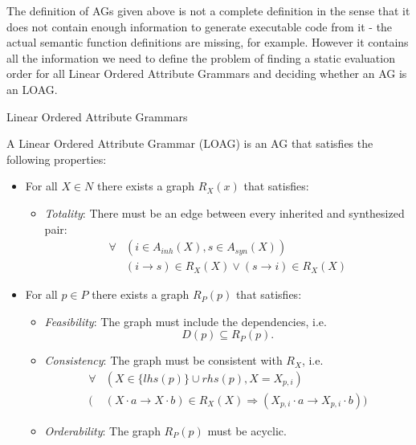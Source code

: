 The definition of AGs given above is not a complete definition in the sense that
it does not contain enough information to generate executable code from it -
the actual semantic function definitions are missing, for example.
However it contains all the information we need to define the problem of 
finding a static evaluation order for all Linear Ordered Attribute Grammars and
deciding whether an AG is an LOAG.

\begin{definition}{Linear Ordered Attribute Grammars}

A Linear Ordered Attribute Grammar (LOAG) is an AG that satisfies
the following properties:
\begin{itemize}
 \item For all $X \in N$ there exists a graph $R_X(x)$ that satisfies:
    \begin{itemize}
        \item \emph{Totality}: There must be an edge between every inherited
                and synthesized pair:
                \begin{equation*}
                 \begin{aligned}
                    \forall &(i \in A_{inh}(X), s\in A_{syn}(X))\\
                        &(i\rightarrow s) \in R_X(X) \lor (s\rightarrow i)
                    \in R_X(X)
                 \end{aligned}
                \end{equation*}
    \end{itemize}
 \item For all $p\in P$ there exists a graph $R_P(p)$ that satisfies:
    \begin{itemize}
        \item \emph{Feasibility}: The graph must include the 
            dependencies, i.e. 
            \begin{equation*}
                D(p) \subseteq R_P(p).
            \end{equation*}
        \item \emph{Consistency}: The graph must be consistent with $R_X$, i.e.
            \begin{equation*}
             \begin{aligned}
                \forall &(X\in \{lhs(p)\}\cup rhs(p), X = X_{p,i})\\
                    (&(X\cdot a\rightarrow X\cdot b)\in R_X(X) 
                    \Rightarrow (X_{p,i}\cdot a\rightarrow X_{p,i}\cdot b))
             \end{aligned}
            \end{equation*}
        \item \emph{Orderability}: The graph $R_P(p)$ must be acyclic.
    \end{itemize}
\end{itemize}
\end{definition}

